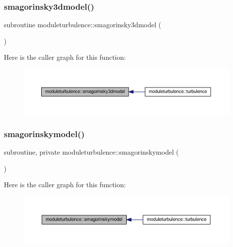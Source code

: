 \subsubsection{\texorpdfstring{smagorinsky3dmodel()}{smagorinsky3dmodel()}}
{\footnotesize\ttfamily subroutine moduleturbulence\+::smagorinsky3dmodel (\begin{DoxyParamCaption}{ }\end{DoxyParamCaption})\hspace{0.3cm}{\ttfamily [private]}}

Here is the caller graph for this function\+:\nopagebreak
\begin{figure}[H]
\begin{center}
\leavevmode
\includegraphics[width=350pt]{namespacemoduleturbulence_ab31d00156edd7f09041fb314d6d0445a_icgraph}
\end{center}
\end{figure}
\mbox{\label{namespacemoduleturbulence_a80e74aea32fd0cd9fd8e273cb359791a}} 
\subsubsection{\texorpdfstring{smagorinskymodel()}{smagorinskymodel()}}
{\footnotesize\ttfamily subroutine, private moduleturbulence\+::smagorinskymodel (\begin{DoxyParamCaption}{ }\end{DoxyParamCaption})\hspace{0.3cm}{\ttfamily [private]}}

Here is the caller graph for this function\+:\nopagebreak
\begin{figure}[H]
\begin{center}
\leavevmode
\includegraphics[width=350pt]{namespacemoduleturbulence_a80e74aea32fd0cd9fd8e273cb359791a_icgraph}
\end{center}
\end{figure}
\mbox{\label{namespacemoduleturbulence_aa75d43b0bd3a1b14c9baa4fe1ba2e6f7}} 

